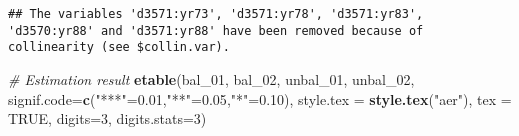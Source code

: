 \documentclass[
]{article}
\newenvironment{Shaded}{\begin{snugshade}}{\end{snugshade}}
\newcommand{\AttributeTok}[1]{\textcolor[rgb]{0.13,0.29,0.53}{#1}}
\newcommand{\CommentTok}[1]{\textcolor[rgb]{0.56,0.35,0.01}{\textit{#1}}}
\newcommand{\ConstantTok}[1]{\textcolor[rgb]{0.56,0.35,0.01}{#1}}
\newcommand{\DecValTok}[1]{\textcolor[rgb]{0.00,0.00,0.81}{#1}}
\newcommand{\FloatTok}[1]{\textcolor[rgb]{0.00,0.00,0.81}{#1}}
\newcommand{\FunctionTok}[1]{\textcolor[rgb]{0.13,0.29,0.53}{\textbf{#1}}}
\newcommand{\NormalTok}[1]{#1}
\newcommand{\OtherTok}[1]{\textcolor[rgb]{0.56,0.35,0.01}{#1}}
\newcommand{\StringTok}[1]{\textcolor[rgb]{0.31,0.60,0.02}{#1}}
\begin{document}
\begin{verbatim}
## The variables 'd3571:yr73', 'd3571:yr78', 'd3571:yr83', 'd3570:yr88' and 'd3571:yr88' have been removed because of collinearity (see $collin.var).
\end{verbatim}

\begin{Shaded}
\begin{Highlighting}[]
\CommentTok{\# Estimation result}
\FunctionTok{etable}\NormalTok{(bal\_01, bal\_02, unbal\_01, unbal\_02, }
       \AttributeTok{signif.code=}\FunctionTok{c}\NormalTok{(}\StringTok{"***"}\OtherTok{=}\FloatTok{0.01}\NormalTok{,}\StringTok{"**"}\OtherTok{=}\FloatTok{0.05}\NormalTok{,}\StringTok{"*"}\OtherTok{=}\FloatTok{0.10}\NormalTok{), }
       \AttributeTok{style.tex =} \FunctionTok{style.tex}\NormalTok{(}\StringTok{"aer"}\NormalTok{),  }\AttributeTok{tex =} \ConstantTok{TRUE}\NormalTok{,}
       \AttributeTok{digits=}\DecValTok{3}\NormalTok{, }
       \AttributeTok{digits.stats=}\DecValTok{3}\NormalTok{)}
\end{Highlighting}
\end{Shaded}
\end{document}
